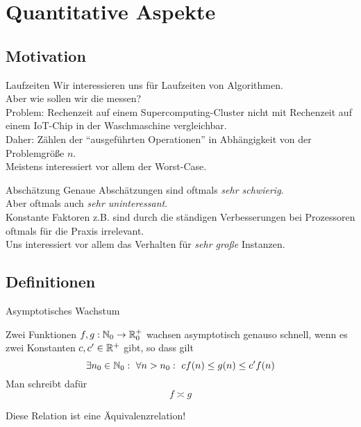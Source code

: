 \section{Quantitative Aspekte}


\subsection{Motivation}
\begin{frame}{Laufzeiten}
	Wir interessieren uns für Laufzeiten von Algorithmen.\\
	Aber wie sollen wir die messen?\\ \pause
	Problem: Rechenzeit auf einem Supercomputing-Cluster nicht mit Rechenzeit auf einem IoT-Chip in der Waschmaschine vergleichbar.\\
	
	\bigskip \pause
	Daher: Zählen der \enquote{ausgeführten Operationen} in Abhängigkeit von der Problemgröße $n$.\\
	Meistens interessiert vor allem der Worst-Case.
\end{frame}

\begin{frame}{Abschätzung}
	Genaue Abschätzungen sind oftmals \textit{sehr schwierig}.\\
	Aber oftmals auch \textit{sehr uninteressant}.\\
	Konstante Faktoren z.B. sind durch die ständigen Verbesserungen bei Prozessoren oftmals für die Praxis irrelevant.\\
	
	\bigskip \pause
	Uns interessiert vor allem das Verhalten für \textit{sehr große} Instanzen.
\end{frame}


\subsection{Definitionen}
\begin{frame}{Asymptotisches Wachstum}
	\begin{Definition}
		Zwei Funktionen $f,g: \mathbb{N}_0 \to \mathbb{R}_0^+$ wachsen asymptotisch genauso schnell, wenn es zwei Konstanten $c, c' \in \mathbb{R}^+$ gibt, so dass gilt $$\exists n_0 \in \mathbb{N}_0: \ \forall n > n_0: \ c f(n) \leq g(n) \leq c'f(n) $$ 
		Man schreibt dafür $$f \asymp g$$
	\end{Definition} \pause
	Diese Relation ist eine Äquivalenzrelation!
\end{frame}

